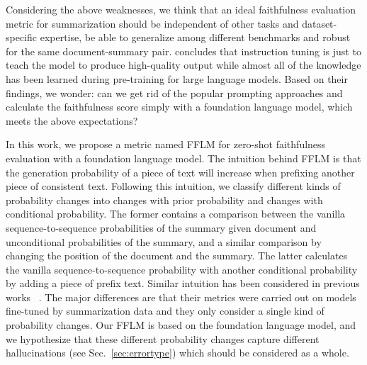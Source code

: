 
Considering the above weaknesses, we think that an ideal faithfulness 
evaluation metric for summarization should be independent of other tasks 
and dataset-specific expertise, be able to generalize among different 
benchmarks and robust for the same document-summary pair. 
\citet{zhou2023lima} concludes that instruction tuning is just to teach the model to produce high-quality output while almost all of the knowledge has been learned during pre-training for large language models. Based on their findings, we wonder: can we get rid of the popular prompting approaches and calculate the faithfulness score simply with a foundation language model, which meets the above expectations?


In this work, we propose a metric named FFLM for zero-shot faithfulness evaluation with a foundation language model. The intuition behind FFLM is that the generation probability of a piece of text will increase when prefixing another piece of consistent text. Following this intuition, we classify different kinds of probability changes into changes with prior probability and changes with conditional probability. The former contains a comparison between the vanilla sequence-to-sequence probabilities of the summary given document and unconditional probabilities of the summary, and a similar comparison by changing the position of the document and the summary. The latter calculates the vanilla sequence-to-sequence probability with another conditional probability by adding a piece of prefix text.
Similar intuition has been considered in previous works ~\cite{she2022cop,son2022harim}. The major differences are that their metrics were carried out on models fine-tuned by summarization data and they only consider a single kind of probability changes. Our FFLM is based on the foundation language model, and we hypothesize that these different probability changes capture different hallucinations (see Sec.~\ref{sec:errortype}) which should be considered as a whole.

